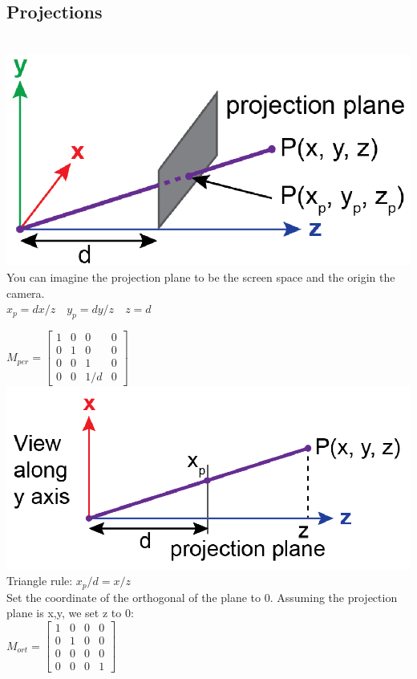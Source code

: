 \subsection*{Projections}
\\
\includegraphics[width = 0.6\columnwidth]{assets/arjun/perspective projection.png}\\
You can imagine the projection plane to be the screen space and the origin the camera.\\
$x_p = dx/z \quad y_p = dy/z \quad z = d$

$ M_{per} = 
\begin{bmatrix}
        1 & 0 & 0 & 0\\
        0 & 1 & 0 & 0\\
        0 & 0 & 1 & 0\\
        0 & 0 & 1/d & 0
\end{bmatrix}$\\
\includegraphics[width = 0.6\columnwidth]{assets/arjun/perspective projection y axis.png}\\
Triangle rule: $x_p/d = x/z$ \\
 Set the coordinate of the orthogonal of the plane to 0. Assuming the projection plane is x,y, we set z to 0: \\
$ M_{ort} = 
\begin{bmatrix}
        1 & 0 & 0 & 0\\
        0 & 1 & 0 & 0\\
        0 & 0 & 0 & 0 \\
        0 & 0 & 0 & 1
\end{bmatrix}$\\

